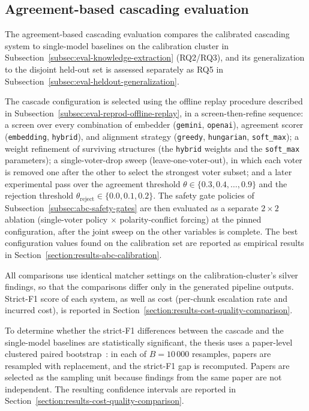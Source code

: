 \subsection{Agreement-based cascading evaluation}\label{subsec:eval-abc}

The agreement-based cascading evaluation compares the calibrated cascading system to single-model baselines on the calibration cluster in Subsection~\ref{subsec:eval-knowledge-extraction} (RQ2/RQ3), and its generalization to the disjoint held-out set is assessed separately as RQ5 in Subsection~\ref{subsec:eval-heldout-generalization}.

The cascade configuration is selected using the offline replay procedure described in Subsection~\ref{subsec:eval-reprod-offline-replay}, in a screen-then-refine sequence: a screen over every combination of embedder (\texttt{gemini}, \texttt{openai}), agreement scorer (\texttt{embedding}, \texttt{hybrid}), and alignment strategy (\texttt{greedy}, \texttt{hungarian}, \texttt{soft\_max}); a weight refinement of surviving structures (the \texttt{hybrid} weights and the \texttt{soft\_max} parameters); a single-voter-drop sweep (leave-one-voter-out), in which each voter is removed one after the other to select the strongest voter subset; and a later experimental pass over the agreement threshold $\theta \in \{0.3, 0.4, \dots, 0.9\}$ and the rejection threshold $\theta_{\mathrm{reject}} \in \{0.0, 0.1, 0.2\}$. The safety gate policies of Subsection~\ref{subsec:abc-safety-gates} are then evaluated as a separate $2\times2$ ablation (single-voter policy $\times$ polarity-conflict forcing) at the pinned configuration, after the joint sweep on the other variables is complete. The best configuration values found on the calibration set are reported as empirical results in Section~\ref{section:results-abc-calibration}. 

All comparisons use identical matcher settings on the calibration-cluster's silver findings, so that the comparisons differ only in the generated pipeline outputs. Strict-F1 score of each system, as well as cost (per-chunk escalation rate and incurred cost), is reported in Section~\ref{section:results-cost-quality-comparison}.

To determine whether the strict-F1 differences between the cascade and the single-model baselines are statistically significant, the thesis uses a paper-level clustered paired bootstrap~\parencite{efron1993introductionbootstrap}: in each of $B = 10\,000$ resamples, papers are resampled with replacement, and the strict-F1 gap is recomputed. Papers are selected as the sampling unit because findings from the same paper are not independent. The resulting confidence intervals are reported in Section~\ref{section:results-cost-quality-comparison}.